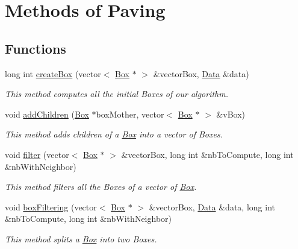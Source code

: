 \hypertarget{group__paving}{\section{\-Methods of \-Paving}
\label{group__paving}
}
\subsection*{\-Functions}
\begin{DoxyCompactItemize}
\item 
long int \hyperlink{group__paving_gad7ff18ff688b5a8a49f24a645f0ac81b}{create\-Box} (vector$<$ \hyperlink{classBox}{\-Box} $\ast$ $>$ \&vector\-Box, \hyperlink{classData}{\-Data} \&data)
\begin{DoxyCompactList}\small\item\em \-This method computes all the initial {\ttfamily \-Boxes} of our algorithm. \end{DoxyCompactList}\item 
void \hyperlink{group__paving_ga817e709f0dfe009173e620d7c7351cb0}{add\-Children} (\hyperlink{classBox}{\-Box} $\ast$box\-Mother, vector$<$ \hyperlink{classBox}{\-Box} $\ast$ $>$ \&v\-Box)
\begin{DoxyCompactList}\small\item\em \-This method adds children of a {\ttfamily \hyperlink{classBox}{\-Box}} into a vector of {\ttfamily \-Boxes}. \end{DoxyCompactList}\item 
void \hyperlink{group__paving_gaec5b916ee7df8d19aa1b7a8f890afd0c}{filter} (vector$<$ \hyperlink{classBox}{\-Box} $\ast$ $>$ \&vector\-Box, long int \&nb\-To\-Compute, long int \&nb\-With\-Neighbor)
\begin{DoxyCompactList}\small\item\em \-This method filters all the {\ttfamily \-Boxes} of a vector of {\ttfamily \hyperlink{classBox}{\-Box}}. \end{DoxyCompactList}\item 
void \hyperlink{group__paving_ga9993202ec3ae8b54b44225efaed1a094}{box\-Filtering} (vector$<$ \hyperlink{classBox}{\-Box} $\ast$ $>$ \&vector\-Box, \hyperlink{classData}{\-Data} \&data, long int \&nb\-To\-Compute, long int \&nb\-With\-Neighbor)
\begin{DoxyCompactList}\small\item\em \-This method splits a {\ttfamily \hyperlink{classBox}{\-Box}} into two {\ttfamily \-Boxes}. \end{DoxyCompactList}\item 

\end{DoxyCompactItemize}
